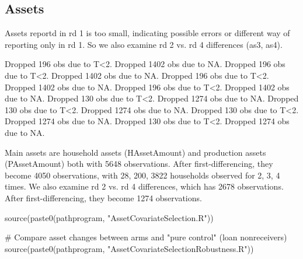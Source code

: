 \subsection{Assets}

Assets reportd in rd 1 is too small, indicating possible errors or different way of reporting only in rd 1. So we also examine rd 2 vs. rd 4 differences (\textsf{as3, as4}).


\begin{Schunk}
\begin{Soutput}
Dropped 196 obs due to T<2.
Dropped 1402 obs due to NA.
Dropped 196 obs due to T<2.
Dropped 1402 obs due to NA.
Dropped 196 obs due to T<2.
Dropped 1402 obs due to NA.
Dropped 196 obs due to T<2.
Dropped 1402 obs due to NA.
Dropped 130 obs due to T<2.
Dropped 1274 obs due to NA.
Dropped 130 obs due to T<2.
Dropped 1274 obs due to NA.
Dropped 130 obs due to T<2.
Dropped 1274 obs due to NA.
Dropped 130 obs due to T<2.
Dropped 1274 obs due to NA.
\end{Soutput}
\end{Schunk}

Main assets are household assets (\textsf{HAssetAmount}) and production assets (\textsf{PAssetAmount}) both with 5648 observations. After first-differencing, they become 4050 observations, with 28, 200, 3822 households observed for 2, 3, 4 times. We also examine rd 2 vs. rd 4 differences, which has 2678 observations. After first-differencing, they become 1274 observations.


\begin{Schunk}
\begin{Sinput}
source(paste0(pathprogram, "AssetCovariateSelection.R"))
\end{Sinput}
\end{Schunk}

\begin{Schunk}
\begin{Sinput}
# Compare asset changes between arms and "pure control" (loan nonreceivers)
source(paste0(pathprogram, "AssetCovariateSelectionRobustness.R"))
\end{Sinput}
\end{Schunk}



